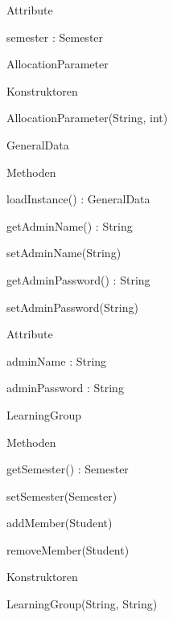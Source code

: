 \documentclass[parskip=full]{scrartcl}
\begin{document}
\begin{itemPackage}
\begin{itemClass}
\begin{itemClassSub}
\begin{itemPlus}
\end{itemPlus}
\item Attribute
\begin{itemPlus}
\item semester : Semester
\end{itemPlus}
\end{itemClassSub}
\item AllocationParameter
\begin{itemClassSub}
\item Konstruktoren
\begin{itemPlus}
\item AllocationParameter(String, int)
\end{itemPlus}
\end{itemClassSub}
\item GeneralData
\begin{itemClassSub}
\item Methoden
\begin{itemPlus}
\item loadInstance() : GeneralData
\end{itemPlus}
\begin{itemMinus}
\item getAdminName() : String
\item setAdminName(String)
\item getAdminPassword() : String
\item setAdminPassword(String)
\end{itemMinus}
\item Attribute 
\begin{itemMinus}
\item adminName : String
\item adminPassword : String
\end{itemMinus}
\end{itemClassSub}
\item LearningGroup
\begin{itemClassSub}
\item Methoden
\begin{itemPlus}
\item getSemester() : Semester
\item setSemester(Semester)
\item addMember(Student)
\item removeMember(Student)
\end{itemPlus}
\item Konstruktoren
\begin{itemPlus}
\item LearningGroup(String, String)

\end{itemPlus}
\end{itemClassSub}
\end{itemClass}
\end{itemPackage}
\end{document}
